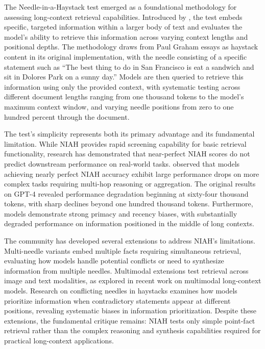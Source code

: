 \documentclass[11pt,letterpaper]{article}
\begin{document}
The Needle-in-a-Haystack test emerged as a foundational methodology for assessing long-context retrieval capabilities. Introduced by \cite{kamradt2023needle}, the test embeds specific, targeted information within a larger body of text and evaluates the model's ability to retrieve this information across varying context lengths and positional depths. The methodology draws from Paul Graham essays as haystack content in its original implementation, with the needle consisting of a specific statement such as ``The best thing to do in San Francisco is eat a sandwich and sit in Dolores Park on a sunny day.'' Models are then queried to retrieve this information using only the provided context, with systematic testing across different document lengths ranging from one thousand tokens to the model's maximum context window, and varying needle positions from zero to one hundred percent through the document.

The test's simplicity represents both its primary advantage and its fundamental limitation. While NIAH provides rapid screening capability for basic retrieval functionality, research has demonstrated that near-perfect NIAH scores do not predict downstream performance on real-world tasks. \cite{hsieh2024ruler} observed that models achieving nearly perfect NIAH accuracy exhibit large performance drops on more complex tasks requiring multi-hop reasoning or aggregation. The original results on GPT-4 revealed performance degradation beginning at sixty-four thousand tokens, with sharp declines beyond one hundred thousand tokens. Furthermore, models demonstrate strong primacy and recency biases, with substantially degraded performance on information positioned in the middle of long contexts.

The community has developed several extensions to address NIAH's limitations. Multi-needle variants embed multiple facts requiring simultaneous retrieval, evaluating how models handle potential conflicts or need to synthesize information from multiple needles. Multimodal extensions test retrieval across image and text modalities, as explored in recent work on multimodal long-context models. Research on conflicting needles in haystacks examines how models prioritize information when contradictory statements appear at different positions, revealing systematic biases in information prioritization. Despite these extensions, the fundamental critique remains: NIAH tests only simple point-fact retrieval rather than the complex reasoning and synthesis capabilities required for practical long-context applications.
\end{document}
